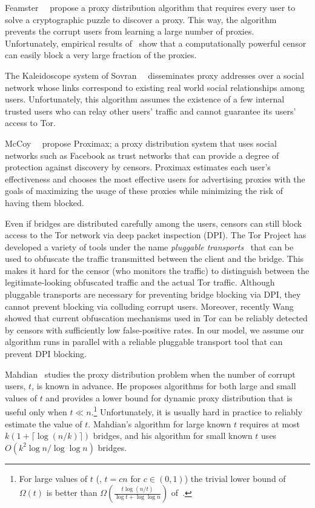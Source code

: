Feamster~\etal~\cite{Feamster:PETS:2003} propose a proxy distribution algorithm that requires every user to solve a cryptographic puzzle to discover a proxy. This way, the algorithm prevents the corrupt users from learning a large number of proxies. Unfortunately, empirical results of~\cite{Feamster:PETS:2003} show that a computationally powerful censor can easily block a very large fraction of the proxies.

The Kaleidoscope system of Sovran~\etal~\cite{Sovran:2008:PSN} disseminates proxy addresses over a social network whose links correspond to existing real world social relationships among users. Unfortunately, this algorithm assumes the existence of a few internal trusted users who can relay other users' traffic and cannot guarantee its users' access to Tor.

McCoy~\etal~\cite{McCoy:FC:2011} propose Proximax; a proxy distribution system that uses social networks such as Facebook as trust networks that can provide a degree of protection against discovery by censors. Proximax estimates each user's effectiveness and chooses the most effective users for advertising proxies with the goals of maximizing the usage of these proxies while minimizing the risk of having them blocked.

Even if bridges are distributed carefully among the users, censors can still block access to the Tor network via deep packet inspection (DPI). The Tor Project has developed a variety of tools under the name \emph{pluggable transports}~\cite{Tor:PluggableTransport} that can be used to obfuscate the traffic transmitted between the client and the bridge. This makes it hard for the censor (who monitors the traffic) to distinguish between the legitimate-looking obfuscated traffic and the actual Tor traffic. Although pluggable transports are necessary for preventing bridge blocking via DPI, they cannot prevent blocking via colluding corrupt users. Moreover, recently Wang~\etal~\cite{Wang:2010:CCS} showed that current obfuscation mechanisms used in Tor can be reliably detected by censors with sufficiently low false-positive rates. In our model, we assume our algorithm runs in parallel with a reliable pluggable transport tool that can prevent DPI blocking.

Mahdian~\cite{Mahdian:2010} studies the proxy distribution problem when the number of corrupt users, $t$, is known in advance. He proposes algorithms for both large and small values of $t$ and provides a lower bound for dynamic proxy distribution that is useful only when ${t \ll n}$.\footnote{ For large values of $t$ (\eg, ${t = cn}$ for ${c \in (0,1)}$) the trivial lower bound of $\Omega(t)$ is better than ${\Omega\left(\frac{t\log{(n/t)}}{\log{t} +\log{\log{n}}}\right)}$ of~\cite{Mahdian:2010}.} Unfortunately, it is usually hard in practice to reliably estimate the value of $t$. Mahdian's algorithm for large known $t$ requires at most ${k\left(1 + \lceil \log{(n/k)} \rceil \right)}$ bridges, and his algorithm for small known $t$ uses ${O(k^2 \log{n} / \log{\log{n}})}$ bridges.


